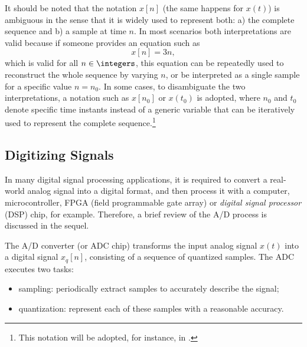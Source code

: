 It should be noted that the notation $x[n]$ (the same happens for $x(t)$) is ambiguous in the sense
that it is widely used to represent both: a) the complete sequence and b) a sample at time $n$.
In most scenarios both interpretations are valid because if someone provides an equation such as
\begin{equation}
x[n] = 3 n,
\label{eq:exampleAmbiguousNotation}
\end{equation}
which is valid for all $n \in \integers$, this equation can be repeatedly used to reconstruct the whole sequence by varying $n$,
or be interpreted as a single sample for a specific value $n=n_0$.
In some cases, to disambiguate the two interpretations, a notation such as $x[n_0]$ or $x(t_0)$ is adopted, where $n_0$ and $t_0$ denote specific time instants instead of a generic variable that can be iteratively used to represent the complete sequence.\footnote{This notation will be adopted, for instance, in .}

\subsection{Digitizing Signals}

In many digital signal processing applications, it is required to convert a real-world analog signal into a digital format, and then process it with a computer, microcontroller, FPGA (field programmable gate array) or \emph{digital signal processor} (DSP) chip, for example. Therefore, a brief review of the A/D process is discussed in the sequel.


The A/D converter (or ADC chip) transforms the input analog signal $x(t)$ into a digital signal $x_q[n]$, consisting of a sequence of quantized samples. The ADC executes two tasks:
\begin{itemize}
	\item sampling: periodically extract samples to accurately describe the signal; 
	\item quantization: represent each of these samples with a reasonable accuracy. 
\end{itemize}

